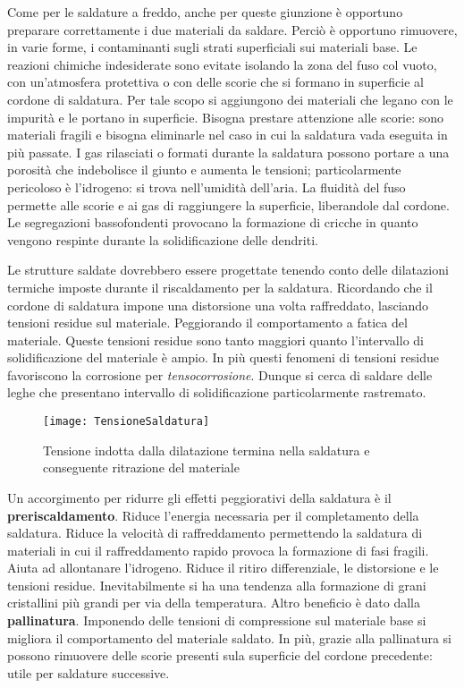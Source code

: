 Come per le saldature a freddo, anche per queste giunzione è opportuno preparare correttamente i due materiali da saldare. Perciò è opportuno rimuovere, in varie forme, i contaminanti sugli strati superficiali sui materiali base.
Le reazioni chimiche indesiderate sono evitate isolando la zona del fuso col vuoto, con un'atmosfera protettiva o con delle scorie che si formano in superficie al cordone di saldatura. Per tale scopo si aggiungono dei materiali che legano con le impurità e le portano in superficie.
Bisogna prestare attenzione alle scorie: sono materiali fragili e bisogna eliminarle nel caso in cui la saldatura vada eseguita in più passate.
I gas rilasciati o formati durante la saldatura possono portare a una porosità che indebolisce il giunto e aumenta le tensioni; particolarmente pericoloso è l'idrogeno: si trova nell'umidità dell'aria.
La fluidità del fuso permette alle scorie e ai gas di raggiungere la superficie, liberandole dal cordone.
Le segregazioni bassofondenti provocano la formazione di cricche in quanto vengono respinte durante la solidificazione delle dendriti.

Le strutture saldate dovrebbero essere progettate tenendo conto delle dilatazioni termiche imposte durante il riscaldamento per la saldatura.
Ricordando che il cordone di saldatura impone una distorsione una volta raffreddato, lasciando tensioni residue sul materiale. Peggiorando il comportamento a fatica del materiale.
Queste tensioni residue sono tanto maggiori quanto l'intervallo di solidificazione del materiale è ampio. 
In più questi fenomeni di tensioni residue favoriscono la corrosione per \textit{tensocorrosione}.
Dunque si cerca di saldare delle leghe che presentano intervallo di solidificazione particolarmente rastremato.

\begin{figure}
\centering
\texttt{[image: TensioneSaldatura]}
\caption{Tensione indotta dalla dilatazione termina nella saldatura e conseguente ritrazione del materiale}
\label{fig:TensioneSaldatura}
\end{figure}

Un accorgimento per ridurre gli effetti peggiorativi della saldatura è il \textbf{preriscaldamento}.
Riduce l'energia necessaria per il completamento della saldatura.
Riduce la velocità di raffreddamento permettendo la saldatura di materiali in cui il raffreddamento rapido provoca la formazione di fasi fragili.
Aiuta ad allontanare l'idrogeno.
Riduce il ritiro differenziale, le distorsione e le tensioni residue.
Inevitabilmente si ha una tendenza alla formazione di grani cristallini più grandi per via della temperatura.
Altro beneficio è dato dalla \textbf{pallinatura}.
Imponendo delle tensioni di compressione sul materiale base si migliora il comportamento del materiale saldato.
In più, grazie alla pallinatura si possono rimuovere delle scorie presenti sula superficie del cordone precedente: utile per saldature successive.

